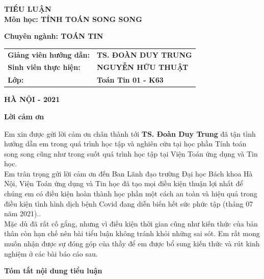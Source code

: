 \documentclass[11pt,a4paper]{article}
\numberwithin{equation}{subsection}
\numberwithin{figure}{subsection}
\numberwithin{table}{subsection}
\begin{document}
\begin{titlepage}
\begin{center}
	\vspace{1cm}	
	\LARGE
	\textbf{TIỂU LUẬN}\\
	
	\vspace{1 cm}
\Large	\textbf{Môn học: TÍNH TOÁN SONG SONG}
	
	\vspace{0.5 cm}
	\Large \textbf{Chuyên ngành: TOÁN TIN}
	
	\end{center}
	\vspace{1.4cm}	
\begin{center}
\begin{tabular}{ll}
\Large \textbf{Giảng viên hướng dẫn:}  &  \Large \textbf{TS. ĐOÀN DUY TRUNG}\\[0.5 cm]
\Large \textbf{Sinh viên thực hiện:} & \Large \textbf{NGUYỄN HỮU THUẬT}\\[0.5 cm]
\Large \textbf{Lớp:} & \Large \textbf{Toán Tin 01 - K63}
\end{tabular}
\end{center}

	\begin{center}
	\vspace{2cm}
	\Large  \textbf{HÀ NỘI - 2021}
	\end{center}
\end{titlepage}	
	\newpage

\begin{center}
\LARGE \textbf{Lời cảm ơn} \\[0.5 cm]
\end{center}

 Em xin được gửi lời cảm ơn chân thành tới  \textbf{TS. Đoàn Duy Trung} đã tận tình hướng dẫn em trong quá trình học tập và nghiên cứu tại học phần Tính toán song song cũng như trong suốt quá trình học tập tại Viện Toán ứng dụng và Tin học. \\

Em trân trọng gửi lời cảm ơn đến Ban Lãnh đạo trường Đại học Bách khoa Hà Nội, Viện Toán ứng dụng và Tin học đã tạo mọi điều kiện thuận lợi nhất để chúng em có điều kiện hoàn thành học phần một cách an toàn và hiệu quả trong điều kiện tình hình dịch bệnh Covid đang diễn biến hết sức phức tập (tháng 07 năm 2021)..\\

Mặc dù đã rất cố gắng, nhưng vì điều kiện thời gian cũng như kiến thức của bản thân còn hạn chế nên bài tiểu luận không tránh khỏi những sai sót. Em rất mong muốn nhận được sự đóng góp của thầy để em được bổ sung kiến thức và rút kinh nghiệm ở các bài báo cáo sau.\\
\begin{center}
\LARGE \textbf{Tóm tắt nội dung tiểu luận}\\[0.5 cm]
\end{center}
\end{document}
